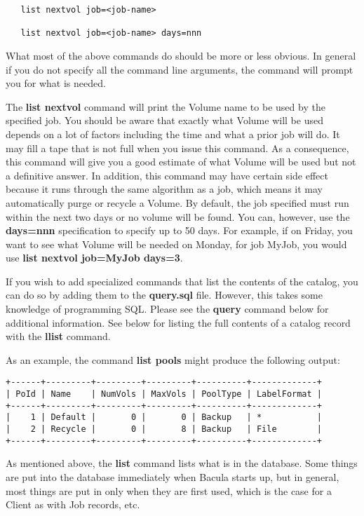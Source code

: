 \begin{description}
\begin{verbatim}
   list nextvol job=<job-name>

   list nextvol job=<job-name> days=nnn

\end{verbatim}
\normalsize

   What most of the above commands do should be more or less obvious.  In
   general if you do not specify all the command line arguments, the
   command will prompt you for what is needed.

   The {\bf list nextvol} command will print the Volume name to be used by
   the specified job.  You should be aware that exactly what Volume will be
   used depends on a lot of factors including the time and what a prior job
   will do.  It may fill a tape that is not full when you issue this
   command.  As a consequence, this command will give you a good estimate
   of what Volume will be used but not a definitive answer.  In addition,
   this command may have certain side effect because it runs through the
   same algorithm as a job, which means it may automatically purge or
   recycle a Volume. By default, the job specified must run within the 
   next two days or no volume will be found. You can, however, use the
   {\bf days=nnn} specification to specify up to 50 days. For example,
   if on Friday, you want to see what Volume will be needed on Monday,
   for job MyJob, you would use {\bf list nextvol job=MyJob days=3}.

   If you wish to add specialized commands that list the contents of the
   catalog, you can do so by adding them to the {\bf query.sql} file.
   However, this takes some knowledge of programming SQL. Please see the
   {\bf query} command below for additional information.  See below for
   listing the full contents of a catalog record with the {\bf llist}
   command.

   As an example, the command {\bf list pools} might produce  the following
   output: 

\footnotesize
\begin{verbatim}
+------+---------+---------+---------+----------+-------------+
| PoId | Name    | NumVols | MaxVols | PoolType | LabelFormat |
+------+---------+---------+---------+----------+-------------+
|    1 | Default |       0 |       0 | Backup   | *           |
|    2 | Recycle |       0 |       8 | Backup   | File        |
+------+---------+---------+---------+----------+-------------+
\end{verbatim}
\normalsize

   As mentioned above, the {\bf list} command lists what is in the
   database.  Some things are put into the database immediately when Bacula
   starts up, but in general, most things are put in only when they are
   first used, which is the case for a Client as with Job records, etc.


\end{description}
